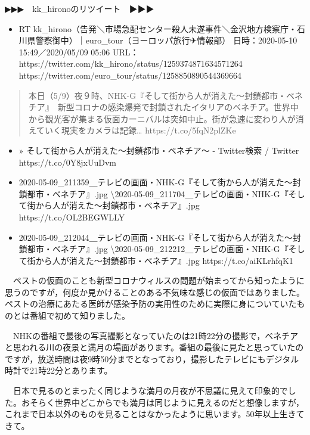 \documentclass[]{ltjarticle}
\providecommand{\tightlist}{%
  \setlength{\itemsep}{0pt}\setlength{\parskip}{0pt}}
\begin{document}
▶▶▶　kk\_hironoのリツイート　▶▶▶

\begin{itemize}
\tightlist
\item
  RT
  kk\_hirono（告発＼市場急配センター殺人未遂事件＼金沢地方検察庁・石川県警察御中）｜euro\_tour（ヨーロッパ旅行✈情報部）
  日時：2020-05-10 15:49／2020/05/09 05:06 URL：
  https://twitter.com/kk\_hirono/status/1259374871634571264
  https://twitter.com/euro\_tour/status/1258850890544369664
\end{itemize}

\begin{quote}
本日（5/9）夜９時、NHK-G『そして街から人が消えた～封鎖都市・ベネチア』　新型コロナの感染爆発で封鎖されたイタリアのベネチア。世界中から観光客が集まる仮面カーニバルは突如中止。街が急速に変わり人が消えていく現実をカメラは記録\ldots{}
https://t.co/5fqN2plZKe
\end{quote}

\begin{itemize}
\item
  » そして街から人が消えた～封鎖都市・ベネチア～ - Twitter検索 / Twitter
  https://t.co/0Y8jxUuDvm
\item
  2020-05-09\_211359＿テレビの画面・NHK-G『そして街から人が消えた～封鎖都市・ベネチア』.jpg
  \textbackslash 2020-05-09\_211704＿テレビの画面・NHK-G『そして街から人が消えた～封鎖都市・ベネチア』.jpg
  https://t.co/OL2BEGWLLY
\item
  2020-05-09\_212044＿テレビの画面・NHK-G『そして街から人が消えた～封鎖都市・ベネチア』.jpg
  \textbackslash 2020-05-09\_212212＿テレビの画面・NHK-G『そして街から人が消えた～封鎖都市・ベネチア』.jpg
  https://t.co/aiKLrhfqK1
\end{itemize}

　ペストの仮面のことも新型コロナウィルスの問題が始まってから知ったように思うのですが，何度か見かけることのある不気味な感じの仮面ではありました。ペストの治療にあたる医師が感染予防の実用性のために実際に身についていたものとは番組で初めて知りました。

　NHKの番組で最後の写真撮影となっていたのは21時22分の撮影で，ベネチアと思われる川の夜景と満月の場面があります。番組の最後に見たと思っていたのですが，放送時間は夜9時50分までとなっており，撮影したテレビにもデジタル時計で21時22分とあります。

　日本で見るのとまったく同じような満月の月夜が不思議に見えて印象的でした。おそらく世界中どこからでも満月は同じように見えるのだと想像しますが，これまで日本以外のものを見ることはなかったように思います。50年以上生きてきて。
\end{document}
